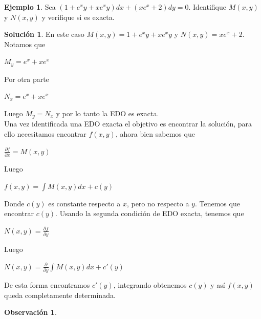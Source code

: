 \documentclass{article}
\theoremstyle{plain}
\theoremstyle{definition}
\newtheorem{ejem}[thm]{Ejemplo}
\newtheorem{sol}[thm]{Solución}
\newtheorem{rmk}[thm]{Observación}
\begin{document}
\begin{ejem}Sea $(1+e^xy+xe^xy)dx+(xe^x+2)dy=0$. Identifique $M(x,y)$ y $N(x,y)$ y verifique si es exacta. \\
\end{ejem}

\begin{sol}En este caso $M(x,y)= 1+e^xy+xe^xy$ y $N(x,y)= xe^x+2$. Notamos que
\end{sol}

\begin{center}
$\displaystyle M_y = e^x+xe^x$
\end{center}

Por otra parte

\begin{center}
$\displaystyle N_x = e^x+xe^x$
\end{center}

Luego $\displaystyle  M_y=N_x $ y por lo tanto la EDO es exacta. \\

Una vez identificada una EDO exacta el objetivo es encontrar la solución, para ello necesitamos encontrar $f(x,y)$, ahora bien sabemos que

\begin{center}
$\displaystyle \frac{\partial f}{\partial x} = M(x,y)$
\end{center}

Luego

\begin{center}
$\displaystyle f(x,y)= \int M(x,y)dx +c(y)$
\end{center}

Donde $c(y)$ es constante respecto a $x$, pero no respecto a $y$. Tenemos que encontrar $c(y)$. Usando la segunda condición de EDO exacta, tenemos que


\begin{center}
$N(x,y) = \displaystyle \frac{\partial f}{\partial y}$
\end{center}

Luego

\begin{center}
$N(x,y) = \displaystyle \frac{\partial }{\partial y} \int M(x,y)dx +c'(y) $
\end{center}

De esta forma encontramos $c'(y)$, integrando obtenemos $c(y)$ y así $f(x,y)$ queda completamente determinada. \\

\begin{rmk}\\
\end{rmk}
\end{document}
